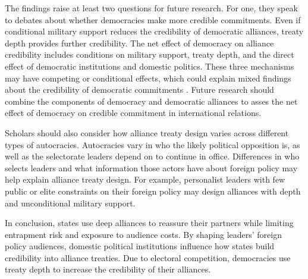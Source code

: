 \documentclass[12pt]{article}
\begin{document}
The findings raise at least two questions for future research.  
For one, they speak to debates about whether democracies make more credible commitments. 
Even if conditional military support reduces the credibility of democratic alliances, treaty depth provides further credibility. 
The net effect of democracy on alliance credibility includes conditions on military support, treaty depth, and the direct effect of democratic institutions and domestic politics. 
These three mechanisms may have competing or conditional effects, which could explain mixed findings about the credibility of democratic commitments \citep{Schultz1999, Leeds1999, Thyne2012, DownesSechser2012, PotterBaum2014}.
Future research should combine the components of democracy and democratic alliances to asses the net effect of democracy on credible commitment in international relations. 


Scholars should also consider how alliance treaty design varies across different types of autocracies. 
Autocracies vary in who the likely political opposition is, as well as the selectorate leaders depend on to continue in office. 
Differences in who selects leaders and what information those actors have about foreign policy \citep{Weeks2008} may help explain alliance treaty design.
For example, personalist leaders with few public or elite constraints on their foreign policy may design alliances with depth and unconditional military support. 


In conclusion, states use deep alliances to reassure their partners while limiting entrapment risk and exposure to audience costs. 
By shaping leaders' foreign policy audiences, domestic political institutions influence how states build credibility into alliance treaties.
Due to electoral competition, democracies use treaty depth to increase the credibility of their alliances. 



 
 
\end{document}
